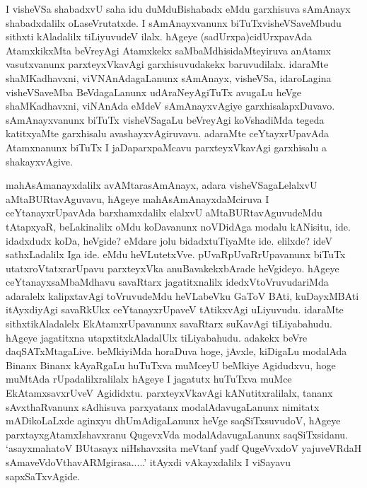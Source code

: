 \begin{artha}
I visheVSa shabadxvU saha idu duMduBishabadx eMdu garxhisuva sAmAnayx
shabadxdalilx oLaseVrutatxde. I sAmAnayxvanunx biTuTxvisheVSaveMbudu
sithxti kAladalilx tiLiyuvudeV ilalx. hAgeye (sadUrxpa)cidUrxpavAda
AtamxkikxMta beVreyAgi Atamxkekx saMbaMdhisidaMteyiruva anAtamx
vasutxvanunx parxteyxVkavAgi garxhisuvudakekx baruvudilalx. idaraMte
shaMKadhavxni, viVNAnAdagaLanunx sAmAnayx, visheVSa, idaroLagina
visheVSaveMba BeVdagaLanunx udAraNeyAgiTuTx avugaLu heVge
shaMKadhavxni, viNAnAda eMdeV sAmAnayxvAgiye
garxhisalapxDuvavo. sAmAnayxvanunx biTuTx visheVSagaLu beVreyAgi
koVshadiMda tegeda katitxyaMte garxhisalu avashayxvAgiruvavu. adaraMte
ceYtayxrUpavAda Atamxnanunx biTuTx I jaDaparxpaMcavu parxteyxVkavAgi
garxhisalu a shakayxvAgive.

mahAsAmanayxdalilx avAMtarasAmAnayx, adara visheVSagaLelalxvU
aMtaBURta\-vAguvavu, hAgeye mahAsAmAnayxdaMciruva I ceYtanayxrUpavAda
barxhamxdalilx elalxvU aMtaBURtavAguvudeMdu tAtapxyaR, beLakinalilx
oMdu koDavanunx noVDidAga modalu kANisitu, ide. idadxdudx koDa, heVgide?
eMdare jolu bidadxtuTiyaMte ide. elilxde? ideV sathxLadalilx Iga
ide. eMdu heVLutetxVve. pUvaRpUvaRrUpavanunx biTuTx
utatxroVtatxrarUpavu parxteyxVka anuBavakekxbArade heVgideyo. hAgeye
ceYtanayxsaMbaMdhavu savaRtarx jagatitxnalilx idedxVtoVruvudariMda
adaralelx kalipxtavAgi toVruvudeMdu heVLabeVku GaToV BAti, kuDayxMBAti
itAyxdiyAgi savaRkUkx ceYtanayxrUpaveV tAtikxvAgi uLiyuvudu. idaraMte
sithxtikAladalelx EkAtamxrUpavanunx savaRtarx suKavAgi
tiLiyabahudu. hAgeye jagatitxna utapxtitxkAladalUlx
tiLiyabahudu. adakekx beVre daqSATxMtagaLive. beMkiyiMda horaDuva
hoge, jAvxle, kiDigaLu modalAda Binanx Binanx kAyaRgaLu huTuTxva muMceyU
beMkiye Agidudxvu, hoge muMtAda rUpadalilxralilalx hAgeye I jagatutx
huTuTxva muMce EkAtamxsavxrUveV Agididxtu. parxteyxVkavAgi
kANutitxralilalx, tananx sAvxthaRvanunx sAdhisuva parxyatanx
modalAdavugaLanunx nimitatx mADikoLaLxde aginxyu dhUmAdigaLanunx heVge
saqSiTxsuvudoV, hAgeye parxtayxgAtamxIshavxranu QugevxVda
modalAdavugaLanunx saqSiTxsidanu. `asayxmahatoV BUtasayx niHshavxsita meVtanf yadf QugeVvxdoV yajuveVRdaH sAmaveVdoV\s thavARMgirasa.....' itAyxdi vAkayxdalilx I
viSayavu sapxSaTxvAgide.
\end{artha}

\centerline{}

